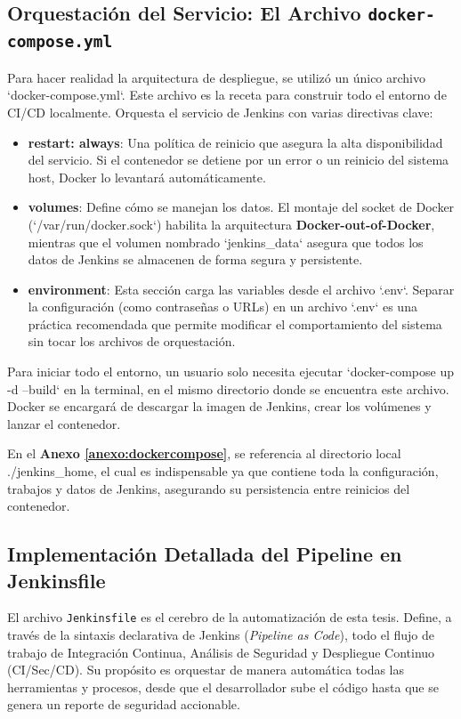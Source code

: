 \subsection{Orquestación del Servicio: El Archivo \texttt{docker-compose.yml}}
\label{subsubsec:compose_exhaustivo}

Para hacer realidad la arquitectura de despliegue, se utilizó un único archivo `docker-compose.yml`. Este archivo es la receta para construir todo el entorno de CI/CD localmente. Orquesta el servicio de Jenkins con varias directivas clave:
\begin{itemize}
    \item \textbf{restart: always}: Una política de reinicio que asegura la alta disponibilidad del servicio. Si el contenedor se detiene por un error o un reinicio del sistema host, Docker lo levantará automáticamente.
    \item \textbf{volumes}: Define cómo se manejan los datos. El montaje del socket de Docker (`/var/run/docker.sock`) habilita la arquitectura \textbf{Docker-out-of-Docker}, mientras que el volumen nombrado `jenkins\_data` asegura que todos los datos de Jenkins se almacenen de forma segura y persistente.
    \item \textbf{environment}: Esta sección carga las variables desde el archivo `.env`. Separar la configuración (como contraseñas o URLs) en un archivo `.env` es una práctica recomendada que permite modificar el comportamiento del sistema sin tocar los archivos de orquestación.
\end{itemize}

Para iniciar todo el entorno, un usuario solo necesita ejecutar `docker-compose up -d --build` en la terminal, en el mismo directorio donde se encuentra este archivo. Docker se encargará de descargar la imagen de Jenkins, crear los volúmenes y lanzar el contenedor.

En el \textbf{Anexo \ref{anexo:dockercompose}}, se referencia al directorio local ./jenkins\_home, el cual es indispensable ya que contiene toda la configuración, trabajos y datos de Jenkins, asegurando su persistencia entre reinicios del contenedor.
\subsection{Implementación Detallada del Pipeline en Jenkinsfile}

El archivo \texttt{Jenkinsfile} es el cerebro de la automatización de esta tesis. Define, a través de la sintaxis declarativa de Jenkins (\textit{Pipeline as Code}), todo el flujo de trabajo de Integración Continua, Análisis de Seguridad y Despliegue Continuo (CI/Sec/CD). Su propósito es orquestar de manera automática todas las herramientas y procesos, desde que el desarrollador sube el código hasta que se genera un reporte de seguridad accionable.

